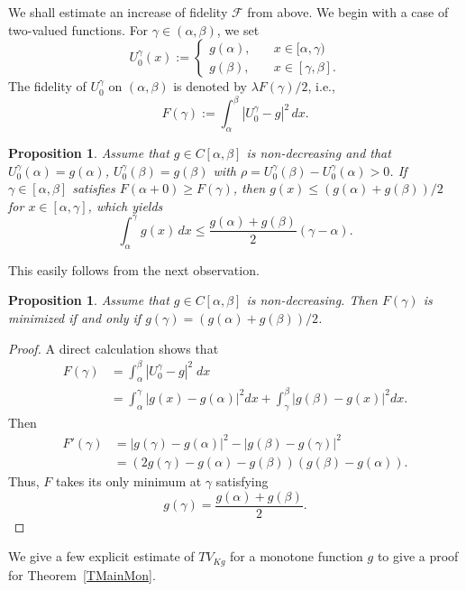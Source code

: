 \documentclass[12pt, reqno]{amsart}
\numberwithin{equation}{section}
\newtheorem{prop}[thm]{Proposition}
\begin{document}
We shall estimate an increase of fidelity $\mathcal{F}$ from above.
 We begin with a case of two-valued functions.
 For $\gamma\in(\alpha,\beta)$, we set
\[
U_0^\gamma (x) := \left\{
\begin{aligned}
	g(\alpha), &\quad x \in [\alpha, \gamma) \\	
	g(\beta), &\quad x \in [\gamma, \beta].
\end{aligned}
\right.
\]
The fidelity of $U_0^\gamma$ on $(\alpha,\beta)$ is denoted by $\lambda F(\gamma)/2$, i.e.,
\[
	F(\gamma) := \int_\alpha^\beta |U_0^\gamma - g|^2\, dx.
\]
\begin{prop} \label{PConMo}
Assume that $g\in C[\alpha,\beta]$ is non-decreasing and that $U_0^\gamma(\alpha)=g(\alpha)$, $U_0^\gamma(\beta)=g(\beta)$ with $\rho=U_0^\gamma(\beta) -U_0^\gamma(\alpha)>0$.
 If $\gamma\in[\alpha,\beta]$ satisfies $F(\alpha+0)\geq F(\gamma)$, then $g(x)\le \left(g(\alpha)+g(\beta)\right)/2$ for $x\in[\alpha,\gamma]$, which yields
\[
	\int_\alpha^\gamma g(x)\, dx
	\le \frac{g(\alpha)+g(\beta)}{2} (\gamma-\alpha).
\]
\end{prop}
This easily follows from the next observation.
\begin{prop} \label{PMF}
Assume that $g\in C[\alpha,\beta]$ is non-decreasing.
 Then $F(\gamma)$ is minimized if and only if $g(\gamma)=\left(g(\alpha)+g(\beta)\right)/2$.
\end{prop}
%
\begin{proof}
A direct calculation shows that
\begin{align*}
	F(\gamma) &= \int_\alpha^\beta |U_0^\gamma-g|^2 \; dx \\
	&= \int_\alpha^\gamma \left|g(x)-g(\alpha)\right|^2 dx
	+ \int_\gamma^\beta \left|g(\beta)-g(x)\right|^2 dx.
\end{align*}
Then
\begin{align*}
	F'(\gamma) &= \left|g(\gamma) - g(\alpha)\right|^2
	- \left|g(\beta) - g(\gamma)\right|^2 \\
	&= \left(2g(\gamma) - g(\alpha) - g(\beta)\right)
	\left(g(\beta) - g(\alpha)\right).
\end{align*}
Thus, $F$ takes its only minimum at $\gamma$ satisfying
\[
	g(\gamma) = \frac{g(\alpha)+g(\beta)}{2}.
\]
\end{proof}

We give a few explicit estimate of $TV_{Kg}$ for a monotone function $g$ to give a proof for Theorem~\ref{TMainMon}.
\end{document}
